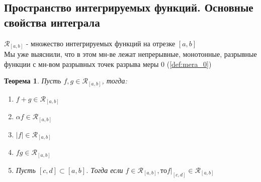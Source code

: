 \documentclass[a4paper]{article}
\newtheorem{theorem}{Теорема}
\theoremstyle{definition}
\newcommand\abs[1]{%
\mbox{$| #1 |$}}
\numberwithin{theorem}{subsection}
\numberwithin{lemma}{subsection}
\numberwithin{definition}{subsection}
\numberwithin{comment*}{subsection}
\numberwithin{consequence}{subsection}
\numberwithin{property}{subsection}
\begin{document}
\subsection{Пространство интегрируемых функций. Основные свойства интеграла}
$\mathcal R_{[a,b]}$ - множество интегрируемых функций на отрезке $[a,b]$\\
Мы уже выяснили, что в этом мн-ве лежат непрерывные, монотонные, разрывные функции с мн-вом разрывных точек разрыва меры 0 (\ref{def:mera_0})
\begin{theorem}
 Пусть $f, g \in \mathcal R_{[a,b]} $, тогда:
 \begin{enumerate}
  \item $f+g \in \mathcal R_{[a,b]}$
  \item $\alpha f \in \mathcal R_{[a,b]}$
  \item $\abs{f} \in \mathcal R_{[a,b]}$
  \item $fg \in \mathcal R_{[a,b]}$
  \item Пусть $[c,d]\subset[a,b]$. Тогда если $f \in \mathcal R_{[a,b]}, то f \Biggr|_{[c,d]} \in \mathcal R_{[a,b]}$
 \end{enumerate}
\end{theorem}
\end{document}
